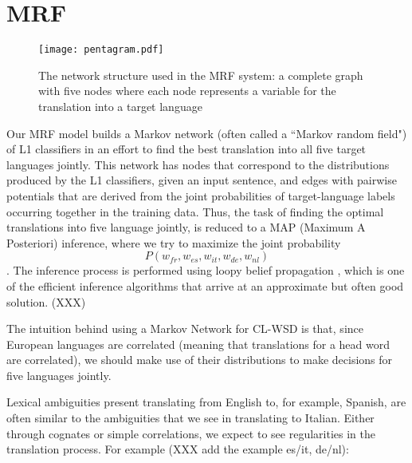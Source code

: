 \documentclass[11pt,letterpaper]{article}
\begin{document}
\section{MRF}
\begin{figure}
  \begin{center}
  \texttt{[image: pentagram.pdf]}
  \end{center}
  \caption{The network structure used in the MRF system: a complete graph with five nodes %
  where each node represents a variable for the translation into a target
language}
  \label{fig:pentagram}
\end{figure}

Our MRF model builds a Markov network (often called a ``Markov random
field") of L1 classifiers in an effort to find the best translation into
all five target languages jointly. This network has nodes that correspond to
the distributions produced by the L1 classifiers, given an input
sentence, and edges with pairwise potentials that are derived from the joint
probabilities of target-language labels occurring together in the training
data. 
Thus, the task of finding the optimal translations into five language jointly, is reduced to a MAP (Maximum A Posteriori) inference, where we try to maximize the joint probability 
$$P(w_{fr},w_{es},w_{it},w_{de},w_{nl})$$. The inference process is performed using loopy belief propagation \cite{DBLP:conf/uai/MurphyWJ99}, which is one of the efficient inference algorithms that arrive at an approximate but often good solution. (XXX)



The intuition behind using a Markov Network for CL-WSD is that, since European languages are correlated (meaning that translations for a head word are correlated), we should make use of their distributions to make decisions for five languages jointly.

Lexical ambiguities
present translating from English to, for example, Spanish, are often similar to
the ambiguities that we see in translating to Italian. Either through cognates
or simple correlations, we expect to see regularities in the translation
process. For example (XXX add the example   es/it, de/nl):
\end{document}
